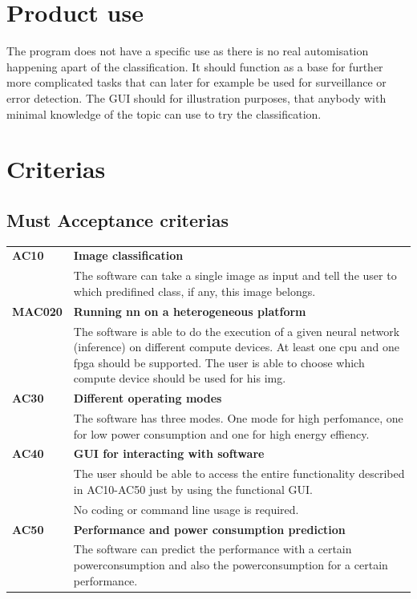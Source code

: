 \documentclass[parskip=full]{scrartcl}
\begin{document}
\section{Product use}
The program does not have a specific use as there is no real automisation happening apart of the classification. It should function as a base for further more complicated tasks that can later for example be used for surveillance or error detection. The GUI should for illustration purposes, that anybody with minimal knowledge of the topic can use to try the classification.

\section{Criterias}
\subsection{Must Acceptance criterias}
\begin{tabular}{p{2cm}p{11.4cm}}
\textbf{AC10} & \textbf{Image classification} \\
& The software can take a single image as input and tell the user to which predifined class, if any, this image belongs.\\
\textbf{MAC020} & \textbf{Running \gls{nn} on a heterogeneous platform} \\
& The software is able to do the execution of a given neural network (inference) on different compute devices. At least one \gls{cpu} and one \gls{fpga} should be supported.
The user is able to choose which compute device should be used for his \gls{img}.\\
\textbf{AC30} & \textbf{Different operating modes} \\
& The software has three modes. One mode for high perfomance, one for low power consumption and one for high energy effiency. \\
\textbf{AC40} & \textbf{GUI for interacting with software} \\
& The user should be able to access the entire functionality described in AC10-AC50 just by using the functional GUI.\\ 
& No coding or command line usage is required.\\
\textbf{AC50} & \textbf{Performance and power consumption prediction}\\
& The software can predict the performance with a certain powerconsumption and also the powerconsumption for a certain performance.

\end{tabular}
\end{document}
